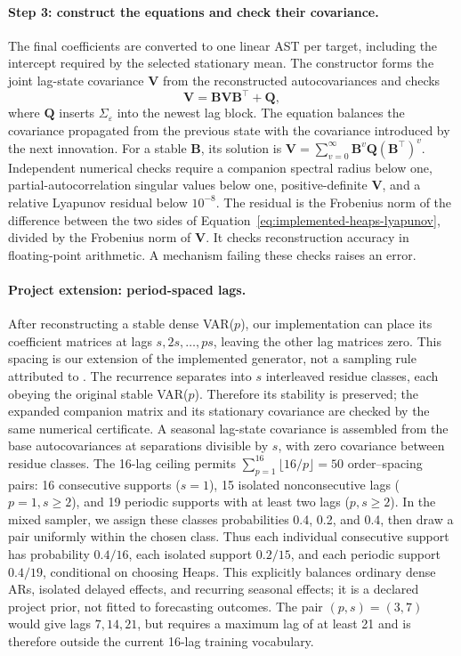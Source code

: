 \paragraph{Step 3: construct the equations and check their covariance.}
The final coefficients are converted to one linear AST per target, including
the intercept required by the selected stationary mean. The constructor
forms the joint lag-state covariance $\mathbf V$ from the reconstructed
autocovariances and checks
\begin{equation}
 \mathbf V=\mathbf B\mathbf V\mathbf B^\top+\mathbf Q,
 \label{eq:implemented-heaps-lyapunov}
\end{equation}
where $\mathbf Q$ inserts $\Sigma_\varepsilon$ into the newest lag block.
The equation balances the covariance propagated from the previous state
with the covariance introduced by the next innovation. For a stable
$\mathbf B$, its solution is
$\mathbf V=\sum_{v=0}^{\infty}\mathbf B^v\mathbf Q(\mathbf B^\top)^v$.
Independent numerical checks require a companion spectral radius below one,
partial-autocorrelation singular values below one, positive-definite
$\mathbf V$, and a relative Lyapunov residual below $10^{-8}$. The residual
is the Frobenius norm of the difference between the two sides of
Equation~\eqref{eq:implemented-heaps-lyapunov}, divided by the Frobenius norm
of $\mathbf V$. It checks reconstruction accuracy in floating-point
arithmetic. A mechanism failing these checks raises an error.

\paragraph{Project extension: period-spaced lags.}
After reconstructing a stable dense VAR($p$), our implementation can place its
coefficient matrices at lags $s,2s,\ldots,ps$, leaving the other lag matrices
zero. This spacing is our extension of the implemented generator, not a
sampling rule attributed to \citet{heaps2023stationarity}. The recurrence
separates into $s$ interleaved residue classes, each obeying the original
stable VAR($p$). Therefore its stability is preserved; the expanded
companion matrix and its stationary covariance are checked by the same
numerical certificate. A seasonal lag-state covariance is assembled from the
base autocovariances at separations divisible by $s$, with zero covariance
between residue classes. The 16-lag ceiling permits
$\sum_{p=1}^{16}\lfloor16/p\rfloor=50$ order--spacing pairs: 16 consecutive
supports ($s=1$), 15 isolated nonconsecutive lags ($p=1,s\geq2$), and 19
periodic supports with at least two lags ($p,s\geq2$). In the mixed sampler,
we assign these classes probabilities 0.4, 0.2, and 0.4, then draw a pair
uniformly within the chosen class. Thus each individual consecutive support
has probability $0.4/16$, each isolated support $0.2/15$, and each periodic
support $0.4/19$, conditional on choosing Heaps. This explicitly balances
ordinary dense ARs, isolated delayed effects, and recurring seasonal effects;
it is a declared project prior, not fitted to forecasting outcomes. The pair $(p,s)=(3,7)$
would give lags $7,14,21$, but requires a maximum lag of at least 21 and is
therefore outside the current 16-lag training vocabulary.

